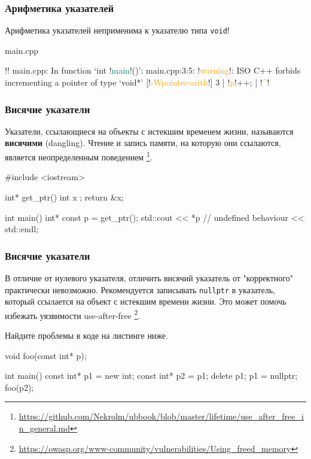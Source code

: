 \documentclass[compress, 8pt]{beamer}
\begin{document}
\begin{frame}[fragile]

    \frametitle{Арифметика указателей}

    Арифметика указателей неприменима к указателю типа \verb|void|!

        {main.cpp}

    \begin{terminalwindow}
!!
main.cpp: In function ‘int !\textcolor{teal}{main}!()’:
main.cpp:3:5: !\textcolor{orange}{warning}!: ISO C++ forbids incrementing a pointer of type ‘void*’ [!\textcolor{orange}{-Wpointer-arith}!]
    3 |     !\textcolor{orange}{p}!++;
      |     !\textcolor{orange}{\^{}}!
    \end{terminalwindow}

\end{frame}

\begin{frame}[fragile]

    \frametitle{Висячие указатели}

    Указатели, ссылающиеся на объекты с истекшим временем жизни,
    называются \textbf{висячими} (dangling).
    Чтение и запись памяти, на которую они ссылаются, является неопределенным
    поведением
    \footnote{\url{https://github.com/Nekrolm/ubbook/blob/master/lifetime/use\_after\_free\_in\_general.md}}.

    \begin{myinplacelisting}[minted language=cpp]
#include <iostream>

int* get_ptr() {
    int x {};
    return &x;
}

int main() {
    int* const p = get_ptr();
    std::cout << *p // undefined behaviour
        << std::endl;
}
    \end{myinplacelisting}

\end{frame}

\begin{frame}[fragile]

    \frametitle{Висячие указатели}

    В отличие от нулевого указателя, отличить висячий указатель от
    "корректного" практически невозможно.
    Рекомендуется записывать \verb|nullptr| в указатель, который ссылается
    на объект с истекшим времени жизни.
    Это может помочь избежать уязвимости use-after-free
    \footnote{\url{https://owasp.org/www-community/vulnerabilities/Using\_freed\_memory}}.

    \begin{task}
        Найдите проблемы в коде на листинге ниже.
    \end{task}

    \begin{myinplacelisting}[minted language=cpp]
void foo(const int* p);

int main() {
    const int* p1 = new int;
    const int* p2 = p1;
    delete p1;
    p1 = nullptr;
    foo(p2);
}
    \end{myinplacelisting}

\end{frame}
\end{document}
